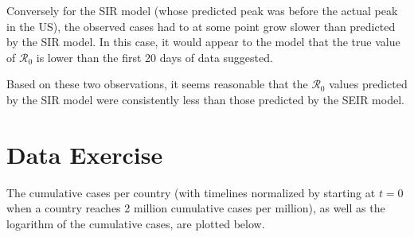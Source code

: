 \documentclass{article}
\newcommand{\rr}{\mathscr{R}_0}
\begin{document}
Conversely for the SIR model (whose predicted peak was before the actual peak in the US), the observed cases had to at some point grow slower than predicted by the SIR model. In this case, it would appear to the model that the true value of $\rr$ is lower than the first 20 days of data suggested.

Based on these two observations, it seems reasonable that the $\rr$ values predicted by the SIR model were consistently less than those predicted by the SEIR model.

\section{Data Exercise}

The cumulative cases per country (with timelines normalized by starting at $t=0$ when a country reaches 2 million cumulative cases per million), as well as the logarithm of the cumulative cases, are plotted below.
\begin{figure}[H]
        \centering
\end{figure}
\end{document}
